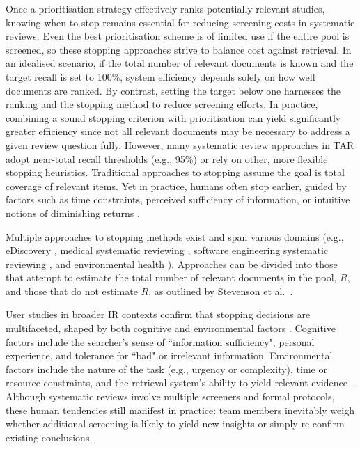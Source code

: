 \documentclass[10pt,oneside]{book}
\begin{document}
Once a prioritisation strategy effectively ranks potentially relevant studies, knowing when to stop remains essential for reducing screening costs in systematic reviews. Even the best prioritisation scheme is of limited use if the entire pool is screened, so these stopping approaches strive to balance cost against retrieval. In an idealised scenario, if the total number of relevant documents is known and the target recall is set to 100\%, system efficiency depends solely on how well documents are ranked. By contrast, setting the target below one harnesses the ranking and the stopping method to reduce screening efforts. In practice, combining a sound stopping criterion with prioritisation can yield significantly greater efficiency since not all relevant documents may be necessary to address a given review question fully. However, many systematic review approaches in TAR adopt near-total recall thresholds (e.g., 95\%) or rely on other, more flexible stopping heuristics. Traditional approaches to stopping assume the goal is total coverage of relevant items. Yet in practice, humans often stop earlier, guided by factors such as time constraints, perceived sufficiency of information, or intuitive notions of diminishing returns \cite{ilani_analysis_2024, browne_cognitive_2007, wu_online_2014}.

Multiple approaches to stopping methods exist and span various domains (e.g., eDiscovery \cite{yang_heuristic_2021, yang_minimizing_2021}, medical systematic reviewing \cite{shemilt_pinpointing_2014}, software engineering systematic reviewing \cite{yu_fast2_2019}, and environmental health \cite{howard_swift-active_2020}). Approaches can be divided into those that attempt to estimate the total number of relevant documents in the pool, $R$, and those that do not estimate $R$, as outlined by Stevenson et al.~\cite{stevenson_stopping_2023}.

User studies in broader IR contexts confirm that stopping decisions are multifaceted, shaped by both cognitive and environmental factors \cite{ilani_analysis_2024}. Cognitive factors include the searcher’s sense of ``information sufficiency", personal experience, and tolerance for ``bad" or irrelevant information. Environmental factors include the nature of the task (e.g., urgency or complexity), time or resource constraints, and the retrieval system's ability to yield relevant evidence \cite{prabha_what_2007}. Although systematic reviews involve multiple screeners and formal protocols, these human tendencies still manifest in practice: team members inevitably weigh whether additional screening is likely to yield new insights or simply re-confirm existing conclusions.
\end{document}

